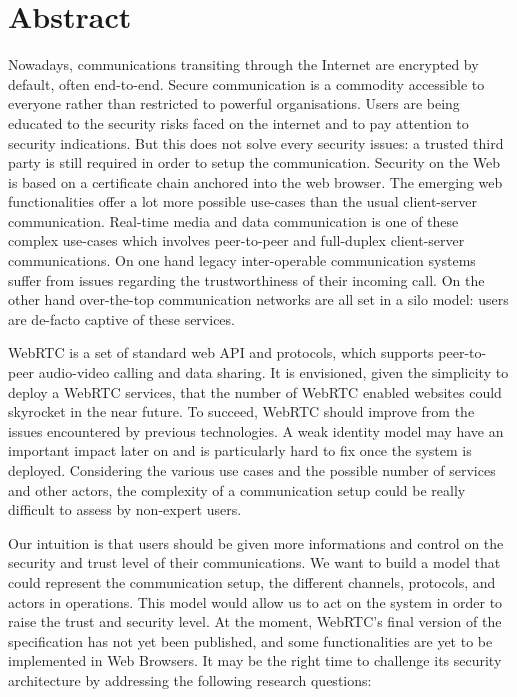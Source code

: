 \chapter*{Abstract}
\thispagestyle{empty}
\glsresetall
Nowadays, communications transiting through the Internet are encrypted by default, often end-to-end.
Secure communication is a commodity accessible to everyone rather than restricted to powerful organisations.
Users are being educated to the security risks faced on the internet and to pay attention to security indications.
But this does not solve every security issues: a trusted third party is still required in order to setup the communication.
Security on the Web is based on a certificate chain anchored into the web browser.
The emerging web functionalities offer a lot more possible use-cases than the usual client-server communication.
Real-time media and data communication is one of these complex use-cases which involves peer-to-peer and full-duplex client-server communications.
On one hand legacy inter-operable communication systems suffer from issues regarding the trustworthiness of their incoming call.
On the other hand over-the-top communication networks are all set in a silo model: users are de-facto captive of these services.

WebRTC is a set of standard web API and protocols, which supports peer-to-peer audio-video calling and data sharing.
It is envisioned, given the simplicity to deploy a WebRTC services, that the number of WebRTC enabled websites could skyrocket in the near future.
To succeed, WebRTC should improve from the issues encountered by previous technologies.
A weak identity model may have an important impact later on and is particularly hard to fix once the system is deployed.
Considering the various use cases and the possible number of services and other actors, the complexity of a communication setup could be really difficult to assess by non-expert users.

Our intuition is that users should be given more informations and control on the security and trust level of their communications.
We want to build a model that could represent the communication setup, the different channels, protocols, and actors in operations.
This model would allow us to act on the system in order to raise the trust and security level.
At the moment, WebRTC's final version of the specification has not yet been published, and some functionalities are yet to be implemented in Web Browsers.
It may be the right time to challenge its security architecture by addressing the following research questions:

